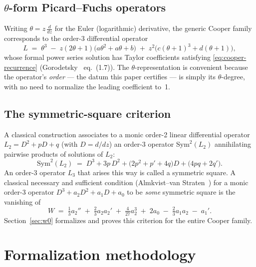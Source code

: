 \documentclass[11pt]{article}
\begin{document}
\subsection{$\theta$-form Picard--Fuchs operators}
\label{sec:background-theta}

Writing $\theta = z\,\tfrac{d}{dz}$ for the Euler (logarithmic) derivative,
the generic Cooper family corresponds to the order-3 differential operator
\begin{equation}
  \label{eq:cooper-theta}
  L \;=\; \theta^3 \;-\; z(2\theta+1)\bigl(a\theta^2 + a\theta + b\bigr)
    \;+\; z^2\bigl(c(\theta+1)^3 + d(\theta+1)\bigr),
\end{equation}
whose formal power series solution has Taylor coefficients satisfying
\eqref{eq:cooper-recurrence} (Gorodetsky~\cite{Gorodetsky2023}
eq.~(1.7)). The $\theta$-representation is convenient because the operator's
\emph{order} --- the datum this paper certifies --- is simply its
$\theta$-degree, with no need to normalize the leading coefficient to~1.

\subsection{The symmetric-square criterion}
\label{sec:background-c3}

A classical construction associates to a monic order-2 linear differential
operator $L_2 = D^2 + p D + q$ (with $D = d/dz$) an order-3 operator
$\mathrm{Sym}^2(L_2)$ annihilating pairwise products of solutions of $L_2$:
\begin{equation}
  \label{eq:symsquare-formula}
  \mathrm{Sym}^2(L_2) \;=\; D^3 + 3p\,D^2 + \bigl(2p^2+p'+4q\bigr) D + \bigl(4pq+2q'\bigr).
\end{equation}
An order-3 operator $L_3$ that arises this way is called a symmetric square. A
classical necessary and sufficient condition (Almkvist--van
Straten~\cite{AlmkvistvanStraten2021}) for a monic order-3 operator
$D^3 + a_2 D^2 + a_1 D + a_0$ to be \emph{some} symmetric square is the
vanishing of
\begin{equation}
  \label{eq:W-criterion}
  W \;=\; \tfrac13 a_2'' \;+\; \tfrac23 a_2 a_2' \;+\; \tfrac{4}{27} a_2^3
    \;+\; 2a_0 \;-\; \tfrac23 a_1 a_2 \;-\; a_1'.
\end{equation}
Section~\ref{sec:w0} formalizes and proves this criterion for the entire
Cooper family.

\section{Formalization methodology}
\label{sec:methodology}
\end{document}
